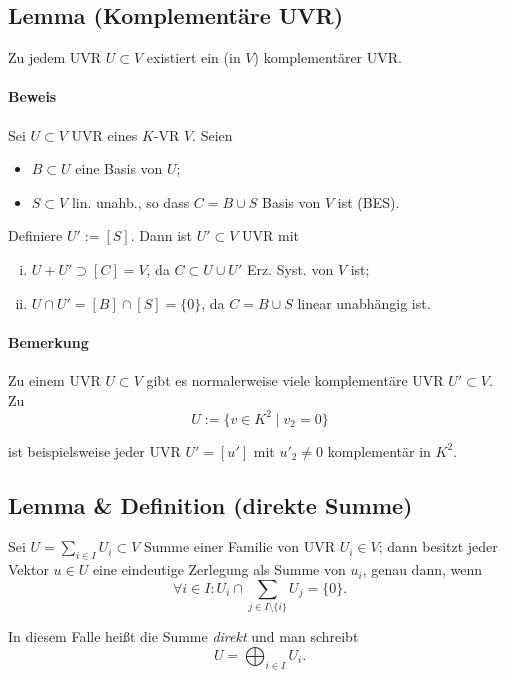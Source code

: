  \subsection{Lemma (Komplementäre UVR)}
 	\begin{Lemma}
 		Zu jedem UVR $ U\subset V $ existiert ein (in $ V $) komplementärer UVR.
 	\end{Lemma}

 	\paragraph{Beweis}
 		Sei $ U\subset V $ UVR eines $ K $-VR $ V $.
 		Seien
 		\begin{itemize}
 			\item $ B\subset U $ eine Basis von $ U $;
 			\item $ S\subset V $ lin. unahb., so dass $ C=B\cup S $ Basis von $ V $ ist (BES).
 		\end{itemize}
 		Definiere $ U':= [S] $. Dann ist $ U'\subset V $ UVR mit
 		\begin{enumerate}[(i)]
 			\item $ U+U' \supset [C] = V $, da $ C\subset U\cup U' $ Erz. Syst. von $ V $ ist;
 			\item $ U\cap U' = [B]\cap [S] = \{0\}$, da $ C=B\cup S $ linear unabhängig ist.
 		\end{enumerate}

 	\paragraph{Bemerkung}
 		Zu einem UVR $ U\subset V $ gibt es normalerweise viele komplementäre UVR $ U'\subset V $.
 		Zu
 		\begin{equation*}
 			U:= \{v\in K^2\mid v_2 = 0\}
 		\end{equation*}

 		ist beispielsweise jeder UVR $ U' = [u']$ mit $u'_2\neq 0 $ komplementär in $ K^2 $.

 \subsection{Lemma \& Definition (direkte Summe)}
 	\begin{Definition}
 		Sei $ U= \sum_{i\in I}U_i\subset V $ Summe einer Familie von UVR $ U_i\in V $; dann besitzt jeder Vektor $ u\in U $ eine eindeutige Zerlegung als Summe von $ u_i $, genau dann, wenn
 		\begin{equation*}
 			\forall i\in I: U_i\cap \sum_{j\in I\setminus \{i\}}U_j = \{0 \}.
 		\end{equation*}

 		In diesem Falle heißt die Summe \emph{direkt} und man schreibt
 		\[
 			U = \bigoplus_{i\in I} U_i.
 		\]
 	\end{Definition}


